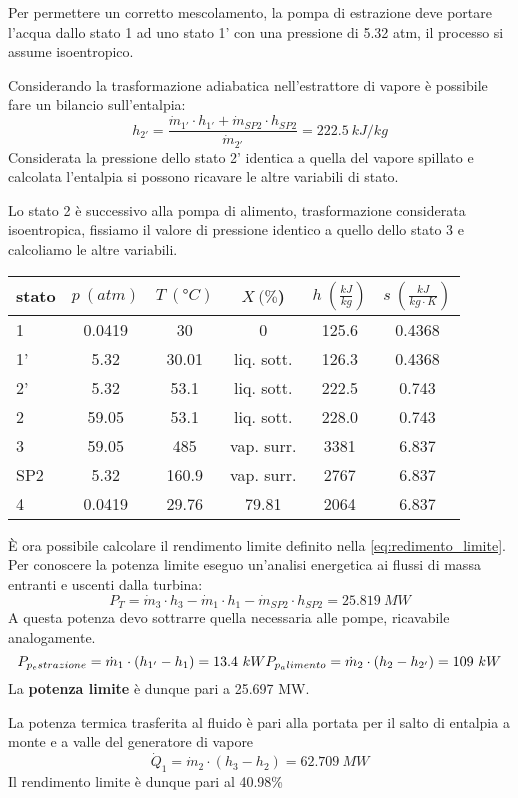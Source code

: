 Per permettere un corretto mescolamento, la pompa di estrazione deve portare l'acqua dallo stato 1 ad uno stato 1' con una pressione di 5.32 atm, il processo si assume
isoentropico.

Considerando la trasformazione adiabatica nell'estrattore di vapore è possibile fare un bilancio sull'entalpia:
\begin{equation*}
    h_{2'} = \frac{\dot m_{1'}\cdot h_{1'} + \dot m_{SP2} \cdot h_{SP2}}{\dot m_{2'}} = 222.5\ kJ/kg
\end{equation*}
Considerata la pressione dello stato 2' identica a quella del vapore spillato e calcolata l'entalpia si possono ricavare le altre variabili di stato.

Lo stato 2 è successivo alla pompa di alimento, trasformazione considerata isoentropica, fissiamo il valore di pressione identico a quello dello stato 3 e calcoliamo
le altre variabili.
\begin{center}
    \begin{tabular}{l|c|c|c|c|c}
        stato    & $p\ (atm)$ & $T\ (\text{°}C) $&$X\ (\%$)& $h\ (\frac{kJ}{kg})$  & $s\ (\frac{kJ}{kg\cdot K})$\\ \hline
        1   &        0.0419 &            30   &    0      & 125.6    &0.4368 \\ \hline     %
        1'  &        5.32    &           30.01   &liq. sott.  & 126.3&0.4368 \\ \hline      %
        2'   &       5.32    &           53.1&liq. sott.& 222.5    &0.743 \\ \hline         %
        2   &        59.05   &           53.1&liq. sott.&  228.0   &0.743   \\ \hline       %
        3   &        59.05   &           485  & vap. surr.& 3381     &6.837  \\ \hline  %
        SP2  &       5.32        &       160.9 &  vap. surr.&2767     &6.837  \\ \hline  %
        4   &        0.0419       &      29.76&     79.81 & 2064     &6.837                 %
    \end{tabular}
\end{center}

È ora possibile calcolare il rendimento limite definito nella \eqref{eq:redimento_limite}. Per conoscere la potenza limite eseguo un'analisi energetica
ai flussi di massa entranti e uscenti dalla turbina:
\begin{equation*}
    P_T = \dot m_3 \cdot h_3 - \dot m_1 \cdot h_1 - \dot m_{SP2} \cdot h_{SP2} = 25.819\ MW
\end{equation*}
A questa potenza devo sottrarre quella necessaria alle pompe, ricavabile analogamente.
\begin{equation*}
    P_{p_estrazione} = \dot m_1 \cdot \left( h_{1'} - h_1 \right) = 13.4\ kW \\
   P_{p_alimento} = \dot m_2 \cdot \left( h_2 - h_{2'} \right) = 109\ kW 
\end{equation*}
La \textbf{potenza limite} è dunque pari a 25.697 MW.

La potenza termica trasferita al fluido è pari alla portata per il salto di entalpia a monte e a valle del generatore di vapore
\begin{equation*}
    \dot Q_1 = \dot m_2 \cdot (h_3-h_2) = 62.709\ MW
\end{equation*}
Il rendimento limite è dunque pari al 40.98\%


